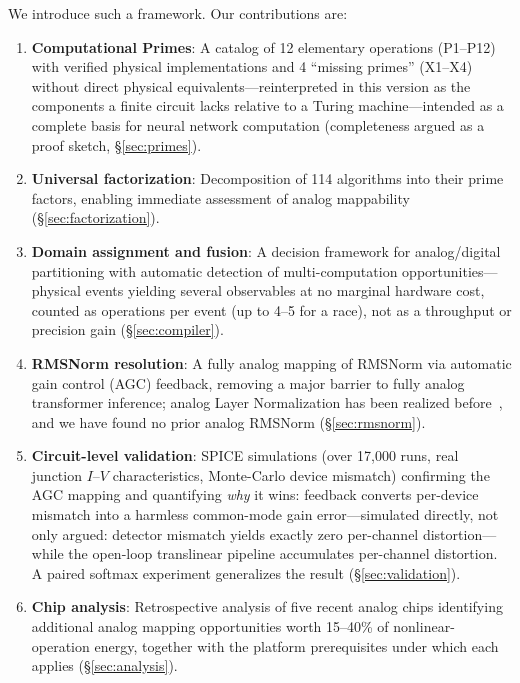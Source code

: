 \documentclass[11pt]{article}
\begin{document}
We introduce such a framework. Our contributions are:

\begin{enumerate}[leftmargin=*]
\item \textbf{Computational Primes}: A catalog of 12 elementary operations (P1--P12) with verified physical implementations and 4 ``missing primes'' (X1--X4) without direct physical equivalents---reinterpreted in this version as the components a finite circuit lacks relative to a Turing machine---intended as a complete basis for neural network computation (completeness argued as a proof sketch, \S\ref{sec:primes}).

\item \textbf{Universal factorization}: Decomposition of 114 algorithms into their prime factors, enabling immediate assessment of analog mappability (\S\ref{sec:factorization}).

\item \textbf{Domain assignment and fusion}: A decision framework for analog/digital partitioning with automatic detection of multi-computation opportunities---physical events yielding several observables at no marginal hardware cost, counted as operations per event (up to 4--5 for a race), not as a throughput or precision gain (\S\ref{sec:compiler}).

\item \textbf{RMSNorm resolution}: A fully analog mapping of RMSNorm via automatic gain control (AGC) feedback, removing a major barrier to fully analog transformer inference; analog Layer Normalization has been realized before~\cite{yang2022}, and we have found no prior analog RMSNorm (\S\ref{sec:rmsnorm}).

\item \textbf{Circuit-level validation}: SPICE simulations (over 17{,}000 runs, real junction $I$--$V$ characteristics, Monte-Carlo device mismatch) confirming the AGC mapping and quantifying \textit{why} it wins: feedback converts per-device mismatch into a harmless common-mode gain error---simulated directly, not only argued: detector mismatch yields exactly zero per-channel distortion---while the open-loop translinear pipeline accumulates per-channel distortion. A paired softmax experiment generalizes the result (\S\ref{sec:validation}).

\item \textbf{Chip analysis}: Retrospective analysis of five recent analog chips identifying additional analog mapping opportunities worth 15--40\% of nonlinear-operation energy, together with the platform prerequisites under which each applies (\S\ref{sec:analysis}).
\end{enumerate}
\end{document}
